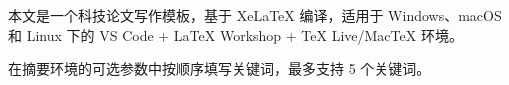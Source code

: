 \begin{cqtabstract}[LaTeX 模板][工程文档][中文排版]
本文是一个科技论文写作模板，基于 XeLaTeX 编译，适用于 Windows、macOS 和 Linux 下的 VS Code +
LaTeX Workshop + TeX Live/MacTeX 环境。

在摘要环境的可选参数中按顺序填写关键词，最多支持 5 个关键词。
\end{cqtabstract}
